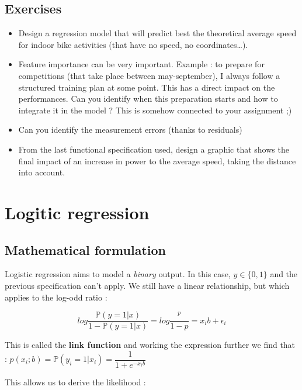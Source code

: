 \documentclass[
]{book}
\providecommand{\tightlist}{%
  \setlength{\itemsep}{0pt}\setlength{\parskip}{0pt}}
\begin{document}
\hypertarget{exercises}{%
\subsection{Exercises}\label{exercises}}

\begin{itemize}
\tightlist
\item
  Design a regression model that will predict best the theoretical average speed for indoor bike activities (that have no speed, no coordinates\ldots).
\item
  Feature importance can be very important. Example : to prepare for competitions (that take place between may-september), I always follow a structured training plan at some point. This has a direct impact on the performances. Can you identify when this preparation starts and how to integrate it in the model ? This is somehow connected to your assignment ;)
\item
  Can you identify the measurement errors (thanks to residuals)
\item
  From the last functional specification used, design a graphic that shows the final impact of an increase in power to the average speed, taking the distance into account.
\end{itemize}

\hypertarget{logitic-regression}{%
\section{Logitic regression}\label{logitic-regression}}

\hypertarget{mathematical-formulation}{%
\subsection{Mathematical formulation}\label{mathematical-formulation}}

Logistic regression aims to model a \emph{binary} output. In this case, \(y \in \{0,1\}\) and the previous specification can't apply. We still have a linear relationship, but which applies to the log-odd ratio :

\[log \dfrac{\mathbb{P}(y=1|x)}{1-\mathbb{P}(y=1|x)} = log \dfrac{^p}{1-p} = x_ib + \epsilon_i\]

This is called the \textbf{link function} and working the expression further we find that : \(p(x_i;b) = \mathbb{P}(y_i=1|x_i) = \dfrac{1}{1+e^{-x_ib}}\)

This allows us to derive the likelihood :
\end{document}
